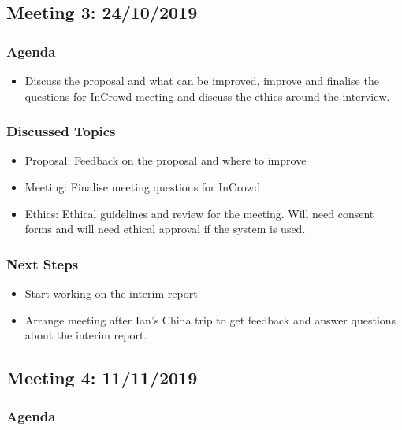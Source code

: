 \begin{appendices}
\subsection{Meeting 3: 24/10/2019}

\subsubsection{Agenda}

\begin{itemize}

 \item Discuss the proposal and what can be improved, improve and finalise the questions for InCrowd meeting and discuss the ethics around the interview.
\end{itemize}


\subsubsection{Discussed Topics}

\begin{itemize}

 \item Proposal: Feedback on the proposal and where to improve
 \item Meeting: Finalise meeting questions for InCrowd
 \item Ethics: Ethical guidelines and review for the meeting. Will need consent forms and will need ethical approval if the system is used.
\end{itemize}

\subsubsection{Next Steps}

\begin{itemize}

 \item Start working on the interim report
 \item Arrange meeting after Ian's China trip to get feedback and answer questions about the interim report.
\end{itemize}

\subsection{Meeting 4: 11/11/2019}

\subsubsection{Agenda}


\end{appendices}
